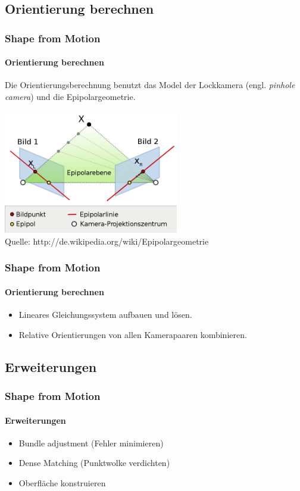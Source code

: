 \documentclass{beamer}
\begin{document}
\subsection{Orientierung berechnen}
\begin{frame}
	\frametitle{Shape from Motion}
	\framesubtitle{Orientierung berechnen}
	
	\vspace{1em}
	Die Orientierungsberechnung benutzt das Model der Lockkamera (engl. \textit{pinhole camera}) und die Epipolargeometrie.
	
	\begin{center}
		\includegraphics[width=217pt]{includes/Epipolargeometrie3}\\
		Quelle: http://de.wikipedia.org/wiki/Epipolargeometrie
	\end{center}
\end{frame}


\begin{frame}
	\frametitle{Shape from Motion}
	\framesubtitle{Orientierung berechnen}
	
	\begin{itemize}
		\item Lineares Gleichungssystem aufbauen und lösen.
		\item Relative Orientierungen von allen Kamerapaaren kombinieren.
	\end{itemize}
\end{frame}


\subsection{Erweiterungen}
\begin{frame}
	\frametitle{Shape from Motion}
	\framesubtitle{Erweiterungen}
	
	\begin{itemize}
		\item Bundle adjustment (Fehler minimieren)
		\item Dense Matching (Punktwolke verdichten)
		\item Oberfläche konstruieren
	\end{itemize}
\end{frame}
\end{document}
